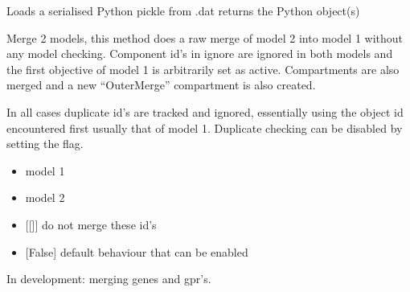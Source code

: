 \documentclass[letterpaper,10pt,english]{sphinxmanual}
\begin{document}

\begin{fulllineitems}
\label{\detokenize{modules_doc:cbmpy.CBTools.loadObj}}
\pysigstartsignatures
{}
\pysigstopsignatures
\sphinxAtStartPar
Loads a serialised Python pickle from .dat returns the Python object(s)

\end{fulllineitems}


\begin{fulllineitems}
\label{\detokenize{modules_doc:cbmpy.CBTools.merge2Models}}
\pysigstartsignatures
{}
\pysigstopsignatures
\sphinxAtStartPar
Merge 2 models, this method does a raw merge of model 2 into model 1 without any model checking.
Component id’s in ignore are ignored in both models and the first objective of model 1 is arbitrarily
set as active. Compartments are also merged and a new “OuterMerge” compartment is also created.

\sphinxAtStartPar
In all cases duplicate id’s are tracked and ignored, essentially using the object id encountered first \sphinxhyphen{}
usually that of model 1. Duplicate checking can be disabled by setting the  flag.
\begin{itemize}
\item {} 
\sphinxAtStartPar
{} model 1

\item {} 
\sphinxAtStartPar
{} model 2

\item {} 
\sphinxAtStartPar
{} {[}{[}{]}{]} do not merge these id’s

\item {} 
\sphinxAtStartPar
{} {[}False{]} default behaviour that can be enabled

\end{itemize}

\sphinxAtStartPar
In development: merging genes and gpr’s.

\end{fulllineitems}
\end{document}
